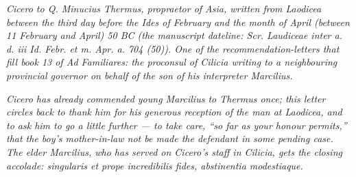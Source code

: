 
\textit{Cicero to Q. Minucius Thermus, propraetor of Asia, written
from Laodicea between the third day before the Ides of February and
the month of April (between 11 February and April) 50 BC (the
manuscript dateline: \textit{Scr. Laudiceae inter a. d. iii Id.
Febr. et m. Apr. a. 704 (50)}). One of the recommendation-letters
that fill book 13 of \textit{Ad Familiares}: the proconsul of
Cilicia writing to a neighbouring provincial governor on behalf of
the son of his interpreter Marcilius.}

\textit{Cicero has already commended young Marcilius to Thermus once;
this letter circles back to thank him for his generous reception of
the man at Laodicea, and to ask him to go a little further --- to
take care, ``so far as your honour permits,'' that the boy's
mother-in-law not be made the defendant in some pending case. The
elder Marcilius, who has served on Cicero's staff in Cilicia, gets
the closing accolade: \textit{singularis et prope incredibilis fides,
abstinentia modestiaque}.}
